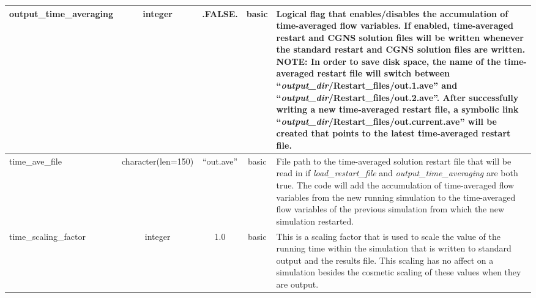 \documentclass[letterpaper,10pt]{article}
\newcommand{\slbsc}{basic}
\newcommand{\typflt}{integer}
\newcommand{\typlog}{integer}
\newcommand{\tc}[1][150]{character(len=#1)}
\newcommand{\fls}{.FALSE.}
\newcommand{\minorline}{\hline}
\newcommand{\groupline}[1]{}
\newlength{\colEwidth}
\newcommand{\descriptionbegin}{}
\newcommand{\descriptionend}{\\ \minorline}
\newcommand{\NOTE}{\newline \textcolor{OrangeRed3}{\textbf{NOTE: }}}
\begin{document}
\begin{longtable}{ | l | c | c | c | p{\colEwidth} | }
    \groupline{TIME AVERAGING}
    output\_time\_averaging     & \typlog & \fls        & \slbsc &
    \descriptionbegin
    Logical flag that enables\slash disables the accumulation of time-averaged
    flow variables. If enabled, time-averaged restart and CGNS solution files
    will be written whenever the standard restart and CGNS solution files are
    written.  \NOTE In order to save disk space, the name of the time-averaged
    restart file will switch between
    \setlength{\parindent}{20pt}\newline\indent
    ``\textsl{output\_dir}\slash{Restart\_files}\slash{out.1.ave}''
    \newline and \newline\indent
    ``\textsl{output\_dir}\slash{Restart\_files}\slash{out.2.ave}''.
    \newline After successfully writing a new time-averaged restart file, a
    symbolic link \newline\indent
    ``\textsl{output\_dir}\slash{Restart\_files}\slash{out.current.ave}'' 
    \newline will be created that points to the latest time-averaged restart
    file.    
    \setlength{\parindent}{0pt}
    \descriptionend
    time\_ave\_file             & \tc     & ``out.ave'' & \slbsc &
    \descriptionbegin
    File path to the time-averaged solution restart file that will be read in if
    \textsl{load\_restart\_file} and \textsl{output\_time\_averaging} are both
    true. The code will add the accumulation of time-averaged flow variables
    from the new running simulation to the time-averaged flow variables of the
    previous simulation from which the new simulation restarted.
    \descriptionend
    time\_scaling\_factor       & \typflt & 1.0         & \slbsc &
    \descriptionbegin
    This is a scaling factor that is used to scale the value of the running time
    within the simulation that is written to standard output and the results
    file. This scaling has no affect on a simulation besides the cosmetic
    scaling of these values when they are output.

\end{longtable}
\end{document}
